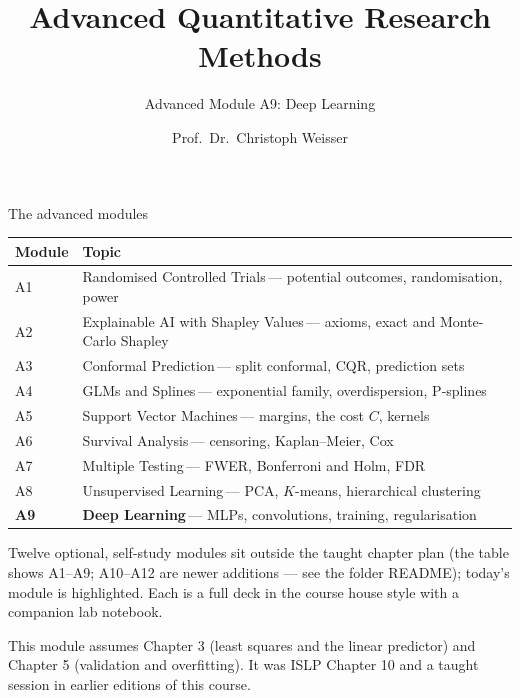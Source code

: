 \documentclass[aspectratio=169,11pt]{beamer}
\title{Advanced Quantitative Research Methods}
\subtitle{Advanced Module A9: Deep Learning}
\author{Prof.\ Dr.\ Christoph Weisser}
\date{}\graphicspath{{images/}}
\begin{document}
\begin{frame}[plain]\titlepage\end{frame}

\begin{frame}{The advanced modules}
  \vspace{-1.5mm}
  \begin{center}
  \scriptsize
  \setlength{\tabcolsep}{5pt}
  \renewcommand{\arraystretch}{1.30}
  \begin{tabular}{@{\hspace{2pt}}l >{\raggedright\arraybackslash}p{}@{\hspace{2pt}}}
    \toprule
    \textbf{Module} & \textbf{Topic} \\
    \midrule
     {\color{accent}A1} & Randomised Controlled Trials\,{\color{black!45}--- potential outcomes, randomisation, power} \\
    \rowcolor{black!3} {\color{accent}A2} & Explainable AI with Shapley Values\,{\color{black!45}--- axioms, exact and Monte-Carlo Shapley} \\
     {\color{accent}A3} & Conformal Prediction\,{\color{black!45}--- split conformal, CQR, prediction sets} \\
    \rowcolor{black!3} {\color{accent}A4} & GLMs and Splines\,{\color{black!45}--- exponential family, overdispersion, P-splines} \\
     {\color{accent}A5} & Support Vector Machines\,{\color{black!45}--- margins, the cost $C$, kernels} \\
    \rowcolor{black!3} {\color{accent}A6} & Survival Analysis\,{\color{black!45}--- censoring, Kaplan--Meier, Cox} \\
     {\color{accent}A7} & Multiple Testing\,{\color{black!45}--- FWER, Bonferroni and Holm, FDR} \\
    \rowcolor{black!3} {\color{accent}A8} & Unsupervised Learning\,{\color{black!45}--- PCA, $K$-means, hierarchical clustering} \\
    \rowcolor{accent!18} \textbf{A9} & \textbf{Deep Learning}\,{\color{accent!75!black}--- MLPs, convolutions, training, regularisation} \\
    \bottomrule
  \end{tabular}
  \end{center}
  \vspace{2mm}
  {\scriptsize Twelve optional, self-study modules sit outside the taught
  chapter plan (the table shows A1--A9; A10--A12 are newer additions --- see the folder README); today's module is highlighted. Each is a full deck in the course
  house style with a companion lab notebook.\par\medskip This module assumes Chapter 3 (least squares and the linear predictor) and Chapter 5 (validation and overfitting). It was ISLP Chapter 10 and a taught session in earlier editions of this course.}
\end{frame}
\end{document}
